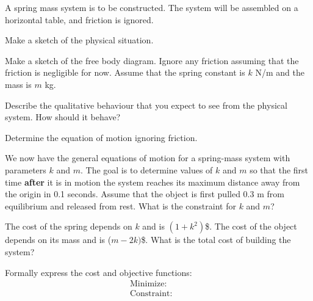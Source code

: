 \begin{problem}
\item A spring mass system is to be constructed. The system will be
  assembled on a horizontal table, and friction is ignored.
  \begin{subproblem}
    \item Make a sketch of the physical situation.
      \vfill
    \item Make a sketch of the free body diagram. Ignore any friction
      assuming that the friction is negligible for now. Assume that
      the spring constant is $k$ N/m and the mass is $m$ kg.
      \vfill
    \item Describe the qualitative behaviour that you expect to see
      from the physical system. How should it behave?
      \vfill
    \item Determine the equation of motion ignoring friction.
      \vfill
  \end{subproblem}

  \clearpage

\item We now have the general equations of motion for a spring-mass
  system with parameters $k$ and $m$. The goal is to determine values
  of $k$ and $m$ so that the first time \textbf{after} it is in motion
  the system reaches its maximum distance away from the origin in 0.1
  seconds. Assume that the object is first pulled 0.3 m from
  equilibrium and released from rest. What is the constraint for $k$
  and $m$?

  \vfill

\item The cost of the spring depends on $k$ and is $(1+k^2)$\$. The cost of
  the object depends on its mass and is ($m-2k)$\$. What is the
  total cost of building the system?

  \vspace{4em}

\item Formally express the cost and objective functions:
    \label{activity:optimization:spring}
    \begin{eqnarray*}
      \mathrm{Minimize:} & &  \\
      \mathrm{Constraint:} & &
    \end{eqnarray*}



\end{problem}


